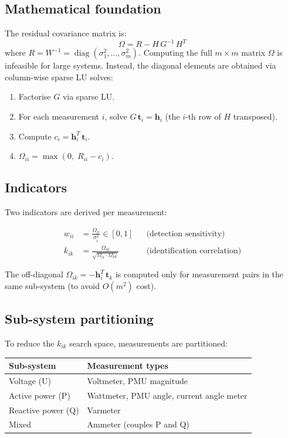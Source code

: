 \documentclass[11pt,a4paper]{article}
\begin{document}
\subsection{Mathematical foundation}

The residual covariance matrix is:
\begin{equation}
  \Omega = R - H\,G^{-1}\,H^T
\end{equation}
where $R = W^{-1} = \operatorname{diag}(\sigma_1^2, \ldots, \sigma_m^2)$.
Computing the full $m \times m$ matrix $\Omega$ is infeasible for large
systems.  Instead, the diagonal elements are obtained via column-wise
sparse LU solves:

\begin{enumerate}
  \item Factorise $G$ via sparse LU.
  \item For each measurement $i$, solve $G\,\mathbf{t}_i = \mathbf{h}_i$
        (the $i$-th row of $H$ transposed).
  \item Compute $c_i = \mathbf{h}_i^T\,\mathbf{t}_i$.
  \item $\Omega_{ii} = \max(0,\; R_{ii} - c_i)$.
\end{enumerate}

\subsection{Indicators}

Two indicators are derived per measurement:

\begin{align}
  w_{ii} &= \frac{\Omega_{ii}}{\sigma_i^2}
    \in [0,1]
    &&\text{(detection sensitivity)} \label{eq:wii} \\
  k_{ik} &= \frac{\Omega_{ik}}{\sqrt{\Omega_{ii}\cdot\Omega_{kk}}}
    &&\text{(identification correlation)} \label{eq:kik}
\end{align}

\noindent
The off-diagonal $\Omega_{ik} = -\mathbf{h}_i^T\,\mathbf{t}_k$ is
computed only for measurement pairs in the same sub-system (to avoid
$O(m^2)$ cost).

\subsection{Sub-system partitioning}

To reduce the $k_{ik}$ search space, measurements are partitioned:

\begin{center}
\begin{tabular}{ll}
  \toprule
  \textbf{Sub-system} & \textbf{Measurement types} \\
  \midrule
  Voltage (U)     & Voltmeter, PMU magnitude \\
  Active power (P) & Wattmeter, PMU angle, current angle meter \\
  Reactive power (Q) & Varmeter \\
  Mixed           & Ammeter (couples P and Q) \\
  \bottomrule
\end{tabular}
\end{center}
\end{document}
